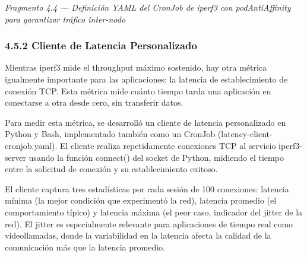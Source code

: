 \documentclass[journal]{IEEEtran}
\begin{document}
\begin{center}\emph{\emph{Fragmento 4.4 --- Definición YAML del CronJob de iperf3 con podAntiAffinity para garantizar tráfico inter-nodo}}\end{center}

\subsubsection{4.5.2 Cliente de Latencia Personalizado}

Mientras iperf3 mide el throughput máximo sostenido, hay otra métrica igualmente importante para las aplicaciones: la latencia de establecimiento de conexión TCP. Esta métrica mide cuánto tiempo tarda una aplicación en conectarse a otra desde cero, sin transferir datos.

Para medir esta métrica, se desarrolló un cliente de latencia personalizado en Python y Bash, implementado también como un CronJob (latency-client-cronjob.yaml). El cliente realiza repetidamente conexiones TCP al servicio iperf3-server usando la función connect() del socket de Python, midiendo el tiempo entre la solicitud de conexión y su establecimiento exitoso.

El cliente captura tres estadísticas por cada sesión de 100 conexiones: latencia mínima (la mejor condición que experimentó la red), latencia promedio (el comportamiento típico) y latencia máxima (el peor caso, indicador del jitter de la red). El jitter es especialmente relevante para aplicaciones de tiempo real como videollamadas, donde la variabilidad en la latencia afecta la calidad de la comunicación más que la latencia promedio.
\end{document}
